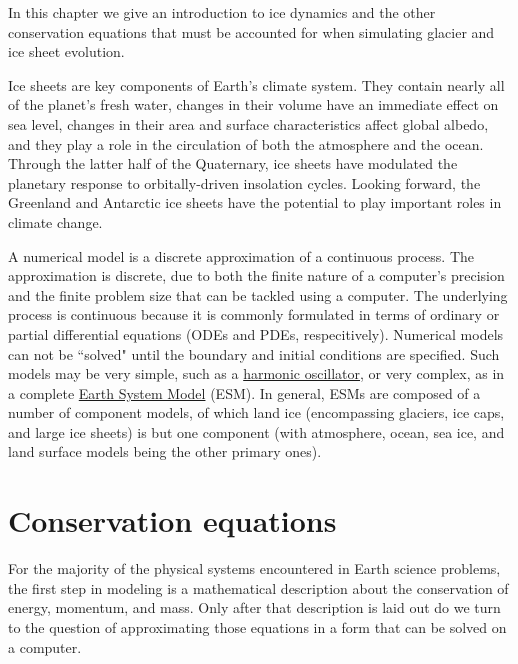 \label{ch:modelingintro}

In this chapter we give an introduction to ice dynamics and the other conservation equations
that must be accounted for when simulating glacier and ice sheet evolution.

Ice sheets are key components of Earth's climate system. They contain
nearly all of the planet's fresh water, changes in their volume have an
immediate effect on sea level, changes in their area and surface
characteristics affect global albedo, and they play a role in the
circulation of both the atmosphere and the ocean. Through the latter
half of the Quaternary, ice sheets have modulated the planetary response
to orbitally-driven insolation cycles. Looking forward, the Greenland
and Antarctic ice sheets have the potential to play important roles in
climate change.

A numerical model is a discrete approximation of a continuous process.
The approximation is discrete, due to both the finite nature of a computer's
precision and the finite problem size that can be tackled using a computer. 
The underlying process is continuous because it is commonly
formulated in terms of ordinary or partial differential equations (ODEs and PDEs,
respecitively). Numerical models can not be ``solved" until the boundary and
initial conditions are specified. Such models may be very simple, such as
a \href{http://en.wikipedia.org/wiki/Harmonic_oscillator}{harmonic oscillator},
or very complex, as in a complete \href{http://en.wikipedia.org/wiki/General_Circulation_Model}
{Earth System Model} (ESM). In general, ESMs are composed of a number of component
models, of which land ice (encompassing glaciers, ice caps, and large ice sheets) is but one
component (with atmosphere, ocean, sea ice, and land surface models being the other
primary ones).   


\section{Conservation equations}

For the majority of the physical systems encountered in Earth science problems, the first step in modeling is a
mathematical description about the conservation of energy, momentum, and mass. Only after that description is
laid out do we turn to the question of approximating those equations in a form that can be solved on a computer. 

